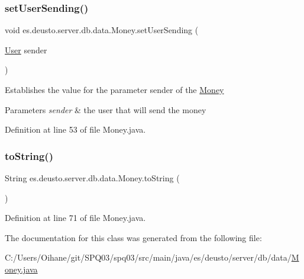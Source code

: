 \subsubsection{\texorpdfstring{set\+User\+Sending()}{setUserSending()}}
{\footnotesize\ttfamily void es.\+deusto.\+server.\+db.\+data.\+Money.\+set\+User\+Sending (\begin{DoxyParamCaption}\item[{\hyperlink{classes_1_1deusto_1_1server_1_1db_1_1data_1_1_user}{User}}]{sender }\end{DoxyParamCaption})}

Establishes the value for the parameter sender of the \hyperlink{classes_1_1deusto_1_1server_1_1db_1_1data_1_1_money}{Money} 
\begin{DoxyParams}{Parameters}
{\em sender} & the user that will send the money \\
\hline
\end{DoxyParams}


Definition at line 53 of file Money.\+java.

\mbox{\label{classes_1_1deusto_1_1server_1_1db_1_1data_1_1_money_a97d3500731b427992e9e40dcc0f0442d}} 
\subsubsection{\texorpdfstring{to\+String()}{toString()}}
{\footnotesize\ttfamily String es.\+deusto.\+server.\+db.\+data.\+Money.\+to\+String (\begin{DoxyParamCaption}{ }\end{DoxyParamCaption})}



Definition at line 71 of file Money.\+java.



The documentation for this class was generated from the following file\+:\begin{DoxyCompactItemize}
\item 
C\+:/\+Users/\+Oihane/git/\+S\+P\+Q03/spq03/src/main/java/es/deusto/server/db/data/\hyperlink{_money_8java}{Money.\+java}\end{DoxyCompactItemize}
